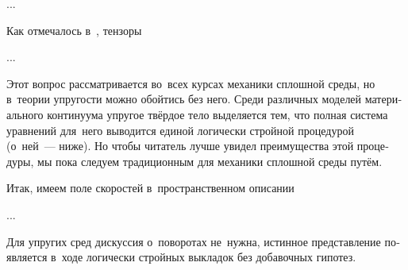 \begin{otherlanguage}{russian}
{\par}

\vspace{1cm}


...

Как отмечалось в~, тензоры


...



\end{otherlanguage}



\label{para:velocityfield}

\begin{otherlanguage}{russian}

Этот вопрос рассматривается во~всех курсах механики сплошной среды, но в~теории упругости можно обойтись без него. Среди различных моделей материального континуума упругое твёрдое тело выделяется тем, что полная система уравнений для~него выводится единой логически стройной процедурой (о~ней~--- ниже). Но чтобы читатель лучше увидел преимущества этой процедуры, мы пока следуем традиционным для механики сплошной среды путём.

Итак, имеем поле скоростей в~пространственном описании


...



Для упругих сред дискуссия о~поворотах не~нужна, истинное представление появляется в~ходе логически стройных выкладок без добавочных гипотез.

\end{otherlanguage}

\newpage



